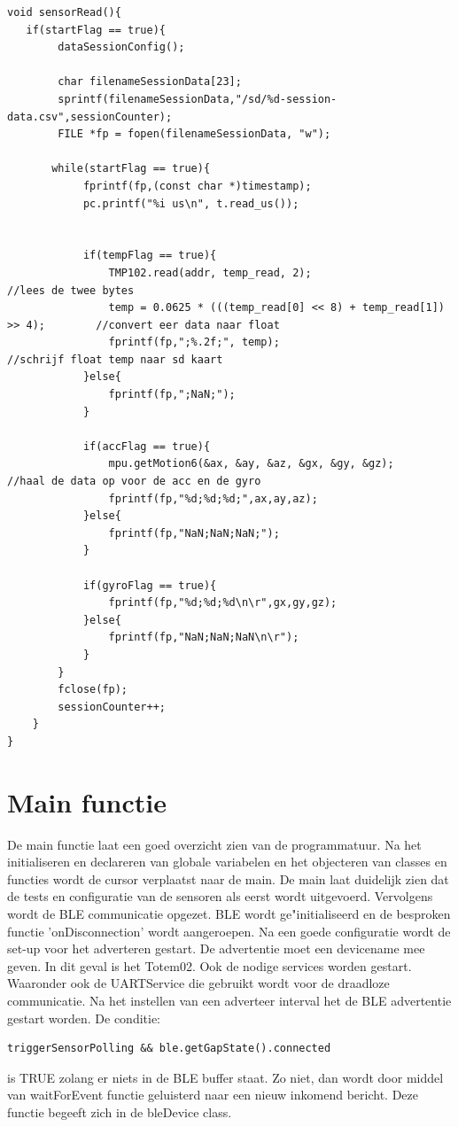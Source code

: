 \documentclass[12pt,a4paper]{report}
\begin{document}
\begin{lstlisting}
void sensorRead(){
   if(startFlag == true){
        dataSessionConfig();
        
        char filenameSessionData[23];
        sprintf(filenameSessionData,"/sd/%d-session-data.csv",sessionCounter);
        FILE *fp = fopen(filenameSessionData, "w");

       while(startFlag == true){
            fprintf(fp,(const char *)timestamp);
            pc.printf("%i us\n", t.read_us());
            
            
            if(tempFlag == true){    
                TMP102.read(addr, temp_read, 2);                                    //lees de twee bytes
                temp = 0.0625 * (((temp_read[0] << 8) + temp_read[1]) >> 4);        //convert eer data naar float
                fprintf(fp,";%.2f;", temp);                                         //schrijf float temp naar sd kaart
            }else{
                fprintf(fp,";NaN;");                         
            }
            
            if(accFlag == true){
                mpu.getMotion6(&ax, &ay, &az, &gx, &gy, &gz);                       //haal de data op voor de acc en de gyro
                fprintf(fp,"%d;%d;%d;",ax,ay,az);                 
            }else{
                fprintf(fp,"NaN;NaN;NaN;");
            }
           
            if(gyroFlag == true){               
                fprintf(fp,"%d;%d;%d\n\r",gx,gy,gz);
            }else{
                fprintf(fp,"NaN;NaN;NaN\n\r");                     
            }
        }
        fclose(fp);
        sessionCounter++;
    }
}
\end{lstlisting}

\newpage

\section{Main functie}

De main functie laat een goed overzicht zien van de programmatuur. Na het initialiseren en declareren van globale variabelen en het objecteren van classes en functies wordt de cursor verplaatst naar de main. De main laat duidelijk zien dat de tests en configuratie van de sensoren als eerst wordt uitgevoerd. Vervolgens wordt de BLE communicatie opgezet. BLE wordt ge"initialiseerd en de besproken functie 'onDisconnection' wordt aangeroepen. Na een goede configuratie wordt de set-up voor het adverteren gestart. De advertentie moet een devicename mee geven. In dit geval is het Totem02. Ook de nodige services worden gestart. Waaronder ook de UARTService die gebruikt wordt voor de draadloze communicatie. Na het instellen van een adverteer interval het de BLE advertentie gestart worden. De conditie:
\begin{lstlisting}
triggerSensorPolling && ble.getGapState().connected 
\end{lstlisting} 
is TRUE zolang er niets in de BLE buffer staat. Zo niet, dan wordt door middel van waitForEvent functie geluisterd naar een nieuw inkomend bericht. Deze functie begeeft zich in de bleDevice class.
\end{document}
